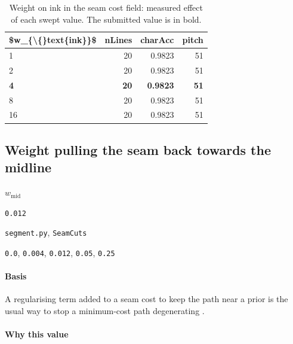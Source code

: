 \begin{table}[htbp]
\centering
\small
\caption{Weight on ink in the seam cost field: measured effect of each swept value. The submitted value is in bold.}
\begin{tabular}{lrrr}
\toprule
\$w\_\{\textbackslash\{\}text\{ink\}\}\$ & \textsf{nLines} & \textsf{charAcc} & \textsf{pitch} \\
\midrule
1 & 20 & 0.9823 & 51 \\
2 & 20 & 0.9823 & 51 \\
\bfseries 4 & \bfseries 20 & \bfseries 0.9823 & \bfseries 51 \\
8 & 20 & 0.9823 & 51 \\
16 & 20 & 0.9823 & 51 \\
\bottomrule
\end{tabular}
\end{table}

\subsection{Weight pulling the seam back towards the midline}

\label{coef:seam-midline-pull}

\begin{description}[leftmargin=5.2em,style=sameline]

\item[Symbol] $w_{\text{mid}}$

\item[Value] \texttt{0.012}

\item[Source] \texttt{segment.py}, \texttt{SeamCuts}

\item[Swept] \texttt{0.0}, \texttt{0.004}, \texttt{0.012}, \texttt{0.05}, \texttt{0.25}

\end{description}

\paragraph{Basis}

A regularising term added to a seam cost to keep the path near a prior is the usual way to stop a minimum-cost path degenerating \cite{avidan2007,arvanitopoulos2014}.

\paragraph{Why this value}

